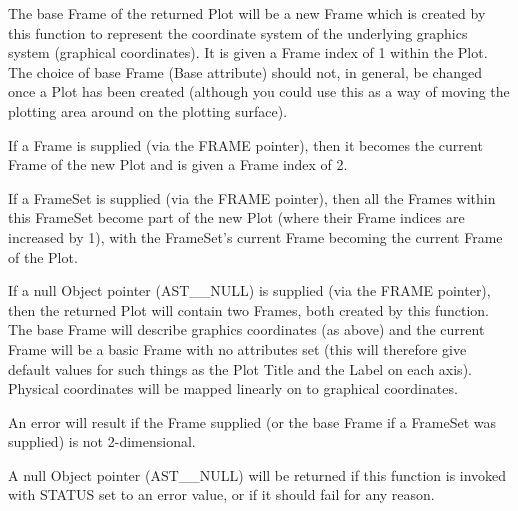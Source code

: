 \documentclass[twoside,11pt]{article}
\newcommand{\htmlref}[2]{#1}
\begin{document}
{{{         \sstitem
         The base Frame of the returned Plot will be a new Frame which
         is created by this function to represent the coordinate system
         of the underlying graphics system (graphical coordinates). It is
         given a Frame index of 1 within the Plot. The choice of base
         Frame (\htmlref{Base}{Base} attribute) should not, in general, be changed once a
         Plot has been created (although you could use this as a way of
         moving the plotting area around on the plotting surface).

         \sstitem
         If a Frame is supplied (via the FRAME pointer), then it
         becomes the current Frame of the new Plot and is given a Frame
         index of 2.

         \sstitem
         If a FrameSet is supplied (via the FRAME pointer), then
         all the Frames within this FrameSet become part of the new Plot
         (where their Frame indices are increased by 1), with the
         FrameSet's current Frame becoming the current Frame of the Plot.

         \sstitem
         If a null Object pointer (AST\_\_NULL) is supplied (via the
         FRAME pointer), then the returned Plot will contain two
         Frames, both created by this function. The base Frame will
         describe graphics coordinates (as above) and the current Frame
         will be a basic Frame with no attributes set (this will
         therefore give default values for such things as the Plot \htmlref{Title}{Title}
         and the Label on each axis). Physical coordinates will be mapped
         linearly on to graphical coordinates.

         \sstitem
         An error will result if the Frame supplied (or the base Frame
         if a FrameSet was supplied) is not 2-dimensional.

         \sstitem
         A null Object pointer (AST\_\_NULL) will be returned if this
         function is invoked with STATUS set to an error value, or if it
         should fail for any reason.
      }
   }
}
\end{document}
